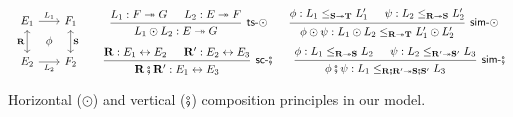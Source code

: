 \begin{figure} %
  \[
  \begin{array}{c}
    \begin{tikzcd}[sep=0.5ex]
      E_1 \ar[dd, leftrightarrow, "\mathbf{R}"']
	  \ar[rr, "L_1"] &&
      F_1 \ar[dd, leftrightarrow, "\mathbf{S}"] \\
      & \phi & \\
      E_2 \ar[rr, "L_2"'] &&
      F_2
    \end{tikzcd}
  \end{array}
  \quad
  \begin{array}{c}
    \begin{prooftree}
      \hypo{L_1 : F \twoheadrightarrow G}
      \hypo{L_2 : E \twoheadrightarrow F}
      \infer2[\kw{ts}-$\odot$]{L_1 \odot L_2 : E \twoheadrightarrow G}
    \end{prooftree}
    \qquad
    \begin{prooftree}
      \hypo{\phi: L_1 \le_{\mathbf{S} \twoheadrightarrow \mathbf{T}} L_1'}
      \hypo{\psi: L_2 \le_{\mathbf{R} \twoheadrightarrow \mathbf{S}} L_2'}
      \infer2[\kw{sim}-$\odot$]{\phi \odot \psi :
	L_1 \odot L_2 \le_{\mathbf{R} \twoheadrightarrow \mathbf{T}} L_1' \odot L_2'}
    \end{prooftree}
    \\[1.5em]
    \begin{prooftree}
      \hypo{\mathbf{R} : E_1 \leftrightarrow E_2}
      \hypo{\mathbf{R}' : E_2 \leftrightarrow E_3}
      \infer2[\kw{sc}-$\vcomp$]{\mathbf{R} \vcomp \mathbf{R}' : E_1 \leftrightarrow E_3}
    \end{prooftree}
    \qquad
    \begin{prooftree}
      \hypo{\phi : L_1 \le_{\mathbf{R} \twoheadrightarrow \mathbf{S}} L_2}
      \hypo{\psi : L_2 \le_{\mathbf{R'} \twoheadrightarrow \mathbf{S'}} L_3}
      \infer2[\kw{sim}-$\vcomp$]{\phi \vcomp \psi : L_1 \le_{\mathbf{R} \vcomp \mathbf{R'} \twoheadrightarrow
	\mathbf{S} \vcomp \mathbf{S'}} L_3}
    \end{prooftree}
  \end{array}
\]
  \caption{Horizontal ($\odot$) and vertical ($\fatsemi$)
    composition principles in our model.}
  \label{fig:hvcomp}
\end{figure}

